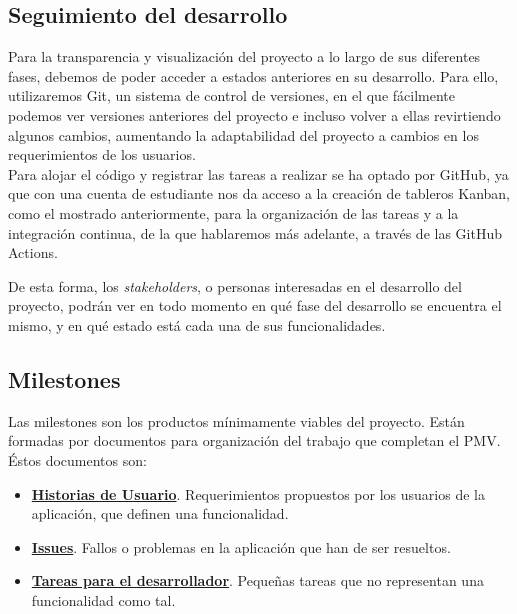 \subsection{Seguimiento del desarrollo}
Para la transparencia y visualización del proyecto a lo largo de sus diferentes fases, debemos de poder acceder a
estados anteriores en su desarrollo. Para ello, utilizaremos Git, un sistema de control de versiones, en el que
fácilmente podemos ver versiones anteriores del proyecto e incluso volver a ellas revirtiendo algunos cambios,
aumentando la adaptabilidad del proyecto a cambios en los requerimientos de los usuarios.\\

Para alojar el código y registrar las tareas a realizar se ha optado por GitHub, ya que con una cuenta de estudiante
nos da acceso a la creación de tableros Kanban, como el mostrado anteriormente, para la organización de las tareas y a
la integración continua, de la que hablaremos más adelante, a través de las GitHub Actions.

De esta forma, los \textit{stakeholders}, o personas interesadas en el desarrollo del proyecto, podrán ver en todo
momento en qué fase del desarrollo se encuentra el mismo, y en qué estado está cada una de sus funcionalidades.\\

\subsection{Milestones}
Las milestones son los productos mínimamente viables del proyecto. Están formadas por documentos para organización del
trabajo que completan el PMV.\\

Éstos documentos son:
\begin{itemize}
    \item \href{https://github.com/Torchu/flixbuff/labels/user story}{\textbf{Historias de Usuario}}. Requerimientos
    propuestos por los usuarios de la aplicación, que definen una funcionalidad.
    \item \href{https://github.com/Torchu/flixbuff/labels/issue}{\textbf{Issues}}. Fallos o problemas en la aplicación
    que han de ser resueltos.
    \item \href{https://github.com/Torchu/flixbuff/labels/dev task}{\textbf{Tareas para el desarrollador}}. Pequeñas
    tareas que no representan una funcionalidad como tal.
\end{itemize}


